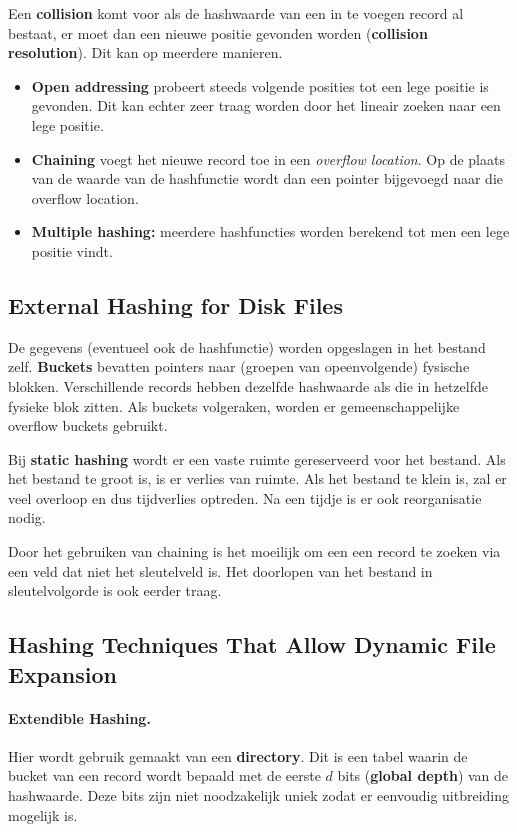 Een \textbf{collision} komt voor als de hashwaarde van een in te voegen record al bestaat, er moet dan een nieuwe positie gevonden worden (\textbf{collision resolution}). Dit kan op meerdere manieren.
\begin{itemize}
\item \textbf{Open addressing} probeert steeds volgende posities tot een lege positie is gevonden. Dit kan echter zeer traag worden door het lineair zoeken naar een lege positie.
\item \textbf{Chaining} voegt het nieuwe record toe in een \textit{overflow location}. Op de plaats van de waarde van de hashfunctie wordt dan een pointer bijgevoegd naar die overflow location.
\item \textbf{Multiple hashing:} meerdere hashfuncties worden berekend tot men een lege positie vindt.
\end{itemize}


\subsection{External Hashing for Disk Files}
De gegevens (eventueel ook de hashfunctie) worden opgeslagen in het bestand zelf. \textbf{Buckets} bevatten pointers naar (groepen van opeenvolgende) fysische blokken. Verschillende records hebben dezelfde hashwaarde als die in hetzelfde fysieke blok zitten. Als buckets volgeraken, worden er gemeenschappelijke overflow buckets gebruikt.

Bij \textbf{static hashing} wordt er een vaste ruimte gereserveerd voor het bestand. Als het bestand te groot is, is er verlies van ruimte. Als het bestand te klein is, zal er veel overloop en dus tijdverlies optreden. Na een tijdje is er ook reorganisatie nodig.

Door het gebruiken van chaining is het moeilijk om een een record te zoeken via een veld dat niet het sleutelveld is. Het doorlopen van het bestand in sleutelvolgorde is ook eerder traag.


\subsection{Hashing Techniques That Allow Dynamic File Expansion}
\paragraph{Extendible Hashing.}
Hier wordt gebruik gemaakt van een \textbf{directory}. Dit is een tabel waarin de bucket van een record wordt bepaald met de eerste $d$ bits (\textbf{global depth}) van de hashwaarde. Deze bits zijn niet noodzakelijk uniek zodat er eenvoudig uitbreiding mogelijk is.


